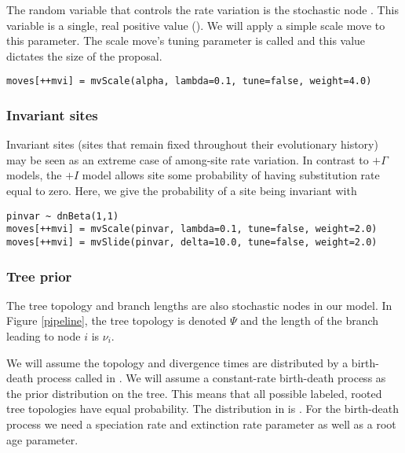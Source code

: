 The random variable that controls the rate variation is the stochastic node . 
This variable is a single, real positive value (). 
We will apply a simple scale move to this parameter.
The scale move's tuning parameter is called  and this value dictates the size of the proposal.
{\tt \begin{snugshade*}
\begin{lstlisting}
moves[++mvi] = mvScale(alpha, lambda=0.1, tune=false, weight=4.0)
\end{lstlisting}
\end{snugshade*}}

\subsubsection{Invariant sites}

Invariant sites (sites that remain fixed throughout their evolutionary history) may be seen as an extreme case of among-site rate variation.
In contrast to $+ \Gamma$ models, the $+I$ model allows site some probability of having substitution rate equal to zero.
Here, we give the probability of a site being invariant with 
{\tt \begin{snugshade*}
\begin{lstlisting}
pinvar ~ dnBeta(1,1)
moves[++mvi] = mvScale(pinvar, lambda=0.1, tune=false, weight=2.0)
moves[++mvi] = mvSlide(pinvar, delta=10.0, tune=false, weight=2.0)
\end{lstlisting}
\end{snugshade*}}




\subsubsection{Tree prior}

The tree topology and branch lengths are also stochastic nodes in our model. 
In Figure \ref{pipeline}, the tree topology is denoted $\Psi$ and the length of the branch leading to node $i$ is $\nu_i$.

We will assume the topology and divergence times are distributed by a birth-death process called  in \RevBayes.
We will assume a constant-rate birth-death process as the prior distribution on the tree.
This means that all possible labeled, rooted tree topologies have equal probability. 
The distribution in \RevBayes is . 
For the birth-death process we need a speciation rate and extinction rate parameter as well as a root age parameter.

